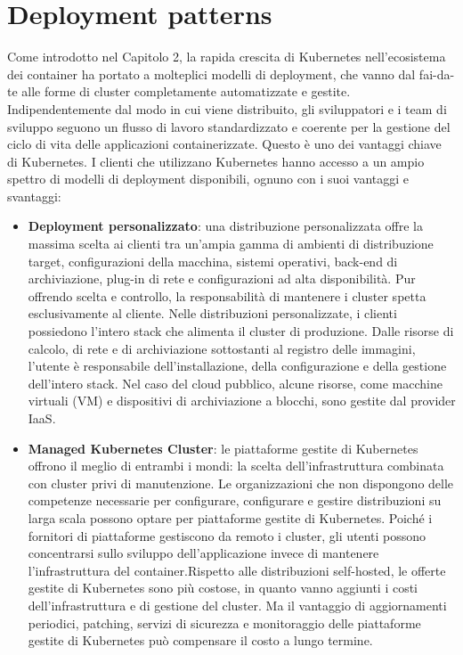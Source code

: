 \documentclass[12pt, a4paper]{report}
\begin{document}
\section{Deployment patterns}
Come introdotto nel Capitolo 2, la rapida crescita di Kubernetes nell'ecosistema dei container ha portato a molteplici modelli di deployment, che vanno dal fai-da-te alle forme di cluster completamente automatizzate e gestite. Indipendentemente dal modo in cui viene distribuito, gli sviluppatori e i team di sviluppo seguono un flusso di lavoro standardizzato e coerente per la gestione del ciclo di vita delle applicazioni containerizzate. Questo è uno dei vantaggi chiave di Kubernetes.
I clienti che utilizzano Kubernetes hanno accesso a un ampio spettro di modelli di deployment disponibili, ognuno con i suoi vantaggi e svantaggi:
\begin{itemize}
  \item  \textbf{Deployment personalizzato}: una distribuzione personalizzata offre la massima scelta ai clienti tra un'ampia gamma di ambienti di distribuzione target, configurazioni della macchina, sistemi operativi, back-end di archiviazione, plug-in di rete e configurazioni ad alta disponibilità. Pur offrendo scelta e controllo, la responsabilità di mantenere i cluster spetta esclusivamente al cliente.
  Nelle distribuzioni personalizzate, i clienti possiedono l'intero stack che alimenta il cluster di produzione. Dalle risorse di calcolo, di rete e di archiviazione sottostanti al registro delle immagini, l'utente è responsabile dell'installazione, della configurazione e della gestione dell'intero stack. Nel caso del cloud pubblico, alcune risorse, come macchine virtuali (VM) e dispositivi di archiviazione a blocchi, sono gestite dal provider IaaS.
  \item \textbf{Managed Kubernetes Cluster}: le piattaforme gestite di Kubernetes offrono il meglio di entrambi i mondi: la scelta dell'infrastruttura combinata con cluster privi di manutenzione. Le organizzazioni che non dispongono delle competenze necessarie per configurare, configurare e gestire distribuzioni su larga scala possono optare per piattaforme gestite di Kubernetes. Poiché i fornitori di piattaforme gestiscono da remoto i cluster, gli utenti possono concentrarsi sullo sviluppo dell'applicazione invece di mantenere l'infrastruttura del container.Rispetto alle distribuzioni self-hosted, le offerte gestite di Kubernetes sono più costose, in quanto vanno aggiunti i costi dell'infrastruttura e di gestione del cluster. Ma il vantaggio di aggiornamenti periodici, patching, servizi di sicurezza e monitoraggio delle piattaforme gestite di Kubernetes può compensare il costo a lungo termine.

\end{itemize}
\end{document}
